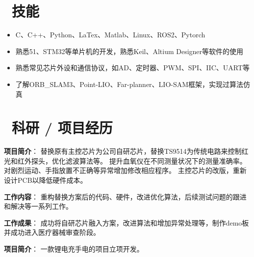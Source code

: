 \documentclass{resume}
\begin{document}
\section{\textcolor[RGB]{50,50,190}{\faCogs\ 技能}}
\begin{itemize}[parsep=0.5ex]
  \item C、C++、Python、LaTex、Matlab、Linux、ROS2、Pytorch
  \item 熟悉51、STM32等单片机的开发，熟悉Keil、Altium Designer等软件的使用
  \item 熟悉常见芯片外设和通信协议，如AD、定时器、PWM、SPI、IIC、UART等
  \item 了解ORB\_SLAM3、Point-LIO、Far-planner、LIO-SAM框架，实现过算法仿真
\end{itemize}


\section{\textcolor[RGB]{50,50,190}{\faUsers\ 科研 / 项目经历}}

\textcolor[RGB]{80,100,190}{\textbf{项目简介}}：
替换原有主控芯片为公司自研芯片，替换TS9514为传统电路来控制红光和红外探头，优化滤波算法等。
提升血氧仪在不同测量状况下的测量准确率。对剧烈运动、手指放置不正确等异常增加修改相应程序。
主控芯片的改版，重新设计PCB以降低硬件成本。

\textcolor[RGB]{80,100,190}{\textbf{工作内容}}：
重构替换方案后的代码、硬件，改进优化算法，后续测试问题的跟进和解决等一系列工作。

\textcolor[RGB]{80,100,190}{\textbf{工作成果}}：
成功将自研芯片融入方案，改进算法和增加异常处理等，制作demo板并成功进入医疗器械审查阶段。

\textcolor[RGB]{80,100,190}{\textbf{项目简介}}：
一款锂电充手电的项目立项开发。
\end{document}
